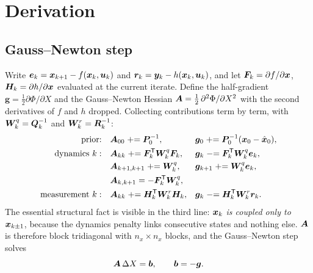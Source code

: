 \section{Derivation}

\subsection{Gauss--Newton step}
Write $\bm{e}_k=\bm{x}_{k+1}-f(\bm{x}_k,\bm{u}_k)$ and $\bm{r}_k=\bm{y}_k-h(\bm{x}_k,\bm{u}_k)$, and let
$\bm{F}_k=\partial f/\partial\bm{x}$, $\bm{H}_k=\partial h/\partial\bm{x}$ evaluated at the current iterate.
Define the half-gradient $\bm{g}=\tfrac12\partial\Phi/\partial X$ and the Gauss--Newton Hessian
$\bm{A}=\tfrac12\,\partial^2\Phi/\partial X^2$ with the second derivatives of $f$ and $h$ dropped.
Collecting contributions term by term, with $\bm{W}^q_k=\bm{Q}_k^{-1}$ and $\bm{W}^r_k=\bm{R}_k^{-1}$:
\begin{equation}
\begin{aligned}
\text{prior:}\quad & \bm{A}_{00}\mathrel{+}=\bm{P}_0^{-1}, &&\bm{g}_0\mathrel{+}=\bm{P}_0^{-1}(\bm{x}_0-\hat{\bm{x}}_0),\\
\text{dynamics }k:\quad & \bm{A}_{kk}\mathrel{+}=\bm{F}_k^{\mathsf{T}}\bm{W}^q_k\bm{F}_k, &&\bm{g}_k\mathrel{-}=\bm{F}_k^{\mathsf{T}}\bm{W}^q_k\bm{e}_k,\\
 & \bm{A}_{k+1,k+1}\mathrel{+}=\bm{W}^q_k, &&\bm{g}_{k+1}\mathrel{+}=\bm{W}^q_k\bm{e}_k,\\
 & \bm{A}_{k,k+1}=-\bm{F}_k^{\mathsf{T}}\bm{W}^q_k, && \\
\text{measurement }k:\quad & \bm{A}_{kk}\mathrel{+}=\bm{H}_k^{\mathsf{T}}\bm{W}^r_k\bm{H}_k, &&\bm{g}_k\mathrel{-}=\bm{H}_k^{\mathsf{T}}\bm{W}^r_k\bm{r}_k .
\end{aligned}
\label{eq:nls-assemble}
\end{equation}
The essential structural fact is visible in the third line: \emph{$\bm{x}_k$ is coupled only to
$\bm{x}_{k\pm1}$}, because the dynamics penalty links consecutive states and nothing else.  $\bm{A}$ is
therefore block tridiagonal with $n_x\times n_x$ blocks, and the Gauss--Newton step solves
\begin{equation}
\bm{A}\,\Delta X=\bm{b},\qquad \bm{b}=-\bm{g}.
\label{eq:nls-normal}
\end{equation}


